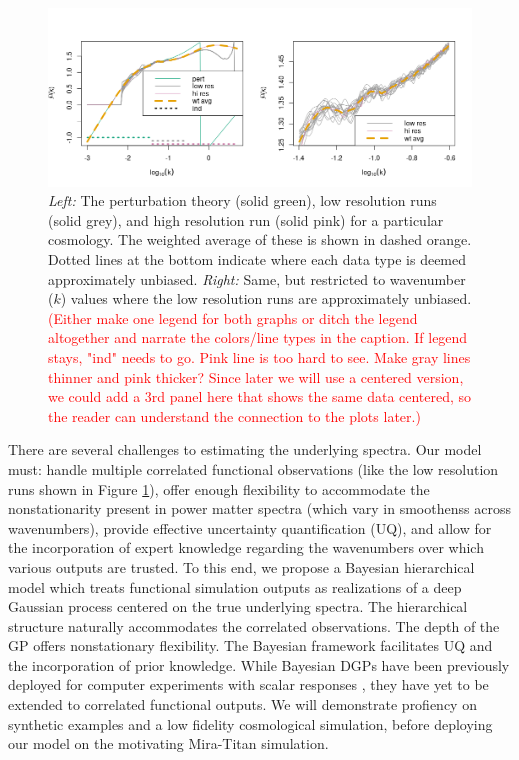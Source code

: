 \documentclass[11pt]{article}
\begin{document}
\begin{figure}[ht]
    \centering
    \includegraphics[width=\linewidth, trim=0 13 0 45, clip=TRUE]{plot_data.png}
    \caption{{\it Left:} The perturbation theory (solid green), low resolution runs (solid grey), 
    and high resolution run  (solid pink) for a particular cosmology. 
    The weighted average of these is shown in dashed orange. Dotted lines at the bottom 
    indicate where each data type is deemed approximately unbiased. 
    {\it Right:} Same, but restricted to wavenumber ($k$) values where the low resolution 
    runs are approximately unbiased.
    \textcolor{red}{(Either make one legend for both graphs or ditch the legend 
    altogether and narrate the colors/line types in the caption.  If legend stays, "ind" needs
    to go.  Pink line is too hard to see.  Make gray lines thinner and pink thicker?
    Since later we will use a centered version, we could add a 3rd panel here that shows the
    same data centered, so the reader can understand the connection to the plots later.)}}
    \label{fig:plot_data}
\end{figure}

There are several challenges to estimating the underlying spectra.  Our model
must: handle multiple correlated functional observations (like the low resolution
runs shown in Figure \ref{fig:plot_data}), offer enough 
flexibility to accommodate the nonstationarity present in power matter spectra 
(which vary in smoothenss across wavenumbers), provide effective uncertainty
quantification (UQ), and allow for the incorporation of expert knowledge 
regarding the wavenumbers over which various outputs are trusted.  To this end, 
we propose a Bayesian hierarchical model which treats functional simulation 
outputs as realizations of a deep Gaussian process \citep[DGP;][]{damianou2013deep} 
centered on the true underlying spectra.  The hierarchical structure naturally
accommodates the correlated observations.  The depth of the GP offers nonstationary
flexibility.  The Bayesian framework facilitates UQ and the incorporation of prior
knowledge.  While Bayesian DGPs have been previously deployed for computer experiments 
with scalar responses \citep[e.g.,][]{sauer2023active,sauer2023vecchia,ming2023deep}, 
they have yet to be extended to correlated functional outputs. 
We will demonstrate profiency on synthetic examples and a low fidelity
cosmological simulation, before deploying our model on the motivating 
Mira-Titan simulation.
\end{document}
